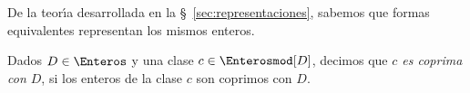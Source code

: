 % 


De la teor\'{\i}a desarrollada en la \S~\ref{sec:representaciones}, sabemos
que formas equivalentes representan los mismos enteros.

\begin{defGeneros}\label{def:generos:clases-coprimas}
	Dados $D\in\Enteros$ y una clase $c\in\Enterosmod[D]$, decimos
	que \emph{$c$ es coprima con $D$}, si los enteros de la clase
	$c$ son coprimos con $D$.
\end{defGeneros}

